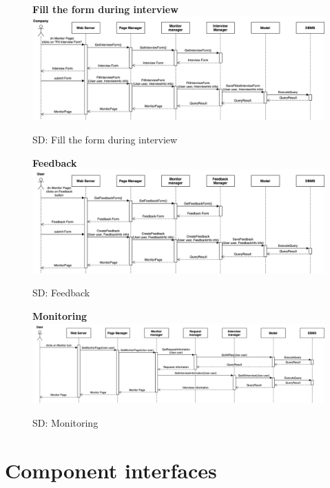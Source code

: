\begin{figure}[H]
\textbf{Fill the form during interview}\newline\newline
\includegraphics[width=15cm]{images/architectural design/runtime/DD-UC_23.drawio.png}
    \caption{SD: Fill the form during interview}
\end{figure}

\begin{figure}[H]
\textbf{Feedback}\newline\newline
\includegraphics[width=15cm]{images/architectural design/runtime/DD-UC24_25.drawio.png}
    \caption{SD: Feedback}
\end{figure}

\begin{figure}[H]
\textbf{Monitoring}\newline\newline
\includegraphics[width=15cm]{images/architectural design/runtime/DD-UC26_27_28.drawio.png}
    \caption{SD: Monitoring}
\end{figure}
\section{Component interfaces}

